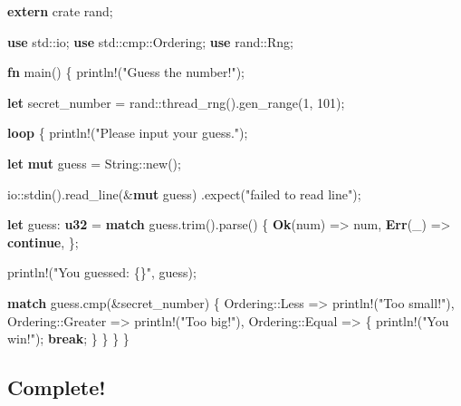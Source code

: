 \documentclass[a4paper,]{book}
\newenvironment{Shaded}{\begin{snugshade}}{\end{snugshade}}
\newcommand{\KeywordTok}[1]{\textcolor[rgb]{0.13,0.29,0.53}{\textbf{{#1}}}}
\newcommand{\DecValTok}[1]{\textcolor[rgb]{0.00,0.00,0.81}{{#1}}}
\newcommand{\StringTok}[1]{\textcolor[rgb]{0.31,0.60,0.02}{{#1}}}
\newcommand{\OtherTok}[1]{\textcolor[rgb]{0.56,0.35,0.01}{{#1}}}
\newcommand{\NormalTok}[1]{{#1}}
\begin{document}
\begin{Shaded}
\begin{Highlighting}[]
\KeywordTok{extern} \NormalTok{crate rand;}

\KeywordTok{use} \NormalTok{std::io;}
\KeywordTok{use} \NormalTok{std::cmp::Ordering;}
\KeywordTok{use} \NormalTok{rand::Rng;}

\KeywordTok{fn} \NormalTok{main() \{}
    \OtherTok{println!}\NormalTok{(}\StringTok{"Guess the number!"}\NormalTok{);}

    \KeywordTok{let} \NormalTok{secret_number = rand::thread_rng().gen_range(}\DecValTok{1}\NormalTok{, }\DecValTok{101}\NormalTok{);}

    \KeywordTok{loop} \NormalTok{\{}
        \OtherTok{println!}\NormalTok{(}\StringTok{"Please input your guess."}\NormalTok{);}

        \KeywordTok{let} \KeywordTok{mut} \NormalTok{guess = String::new();}

        \NormalTok{io::stdin().read_line(&}\KeywordTok{mut} \NormalTok{guess)}
            \NormalTok{.expect(}\StringTok{"failed to read line"}\NormalTok{);}

        \KeywordTok{let} \NormalTok{guess: }\KeywordTok{u32} \NormalTok{= }\KeywordTok{match} \NormalTok{guess.trim().parse() \{}
            \KeywordTok{Ok}\NormalTok{(num) => num,}
            \KeywordTok{Err}\NormalTok{(_) => }\KeywordTok{continue}\NormalTok{,}
        \NormalTok{\};}

        \OtherTok{println!}\NormalTok{(}\StringTok{"You guessed: \{\}"}\NormalTok{, guess);}

        \KeywordTok{match} \NormalTok{guess.cmp(&secret_number) \{}
            \NormalTok{Ordering::Less    => }\OtherTok{println!}\NormalTok{(}\StringTok{"Too small!"}\NormalTok{),}
            \NormalTok{Ordering::Greater => }\OtherTok{println!}\NormalTok{(}\StringTok{"Too big!"}\NormalTok{),}
            \NormalTok{Ordering::Equal   => \{}
                \OtherTok{println!}\NormalTok{(}\StringTok{"You win!"}\NormalTok{);}
                \KeywordTok{break}\NormalTok{;}
            \NormalTok{\}}
        \NormalTok{\}}
    \NormalTok{\}}
\NormalTok{\}}
\end{Highlighting}
\end{Shaded}

\subsection{Complete!}\label{complete}
\end{document}
